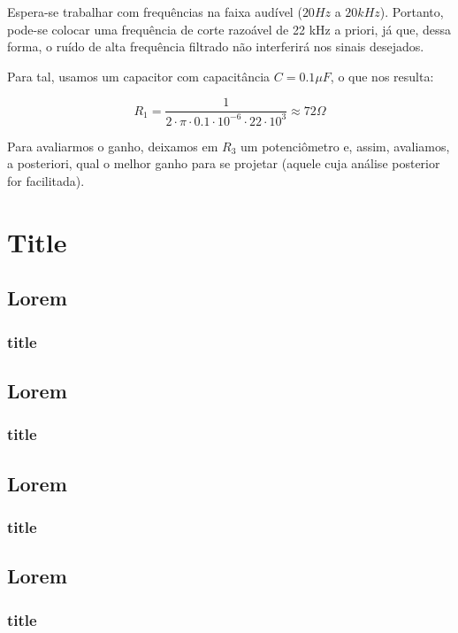 \documentclass[11pt,a4paper]{report}
\begin{document}
	
	Espera-se trabalhar com frequências na faixa audível ($20 Hz$ a $20 kHz$). Portanto, pode-se colocar uma frequência de corte razoável de 22 kHz a priori, já que, dessa forma, o ruído de alta frequência filtrado não interferirá nos sinais desejados.
	
	
	Para tal, usamos um capacitor com capacitância $C = 0.1\mu{F}$, o que nos resulta:
	
	\begin{equation}
	R_1 = \frac{1}{2\cdot{\pi}\cdot{0.1}\cdot{10^{-6}}\cdot{22}\cdot{10^3}} \approx 72\Omega 
	\end{equation}
	
	Para avaliarmos o ganho, deixamos em $R_3$ um potenciômetro e, assim, avaliamos, a posteriori, qual o melhor ganho para se projetar (aquele cuja análise posterior for facilitada).
	

\chapter{Title}
	\section{Lorem}
	\subsection{title}

		\section{Lorem}
	\subsection{title}
	
		\section{Lorem}
	\subsection{title}
	
		\section{Lorem}
	\subsection{title}
	
\end{document}
